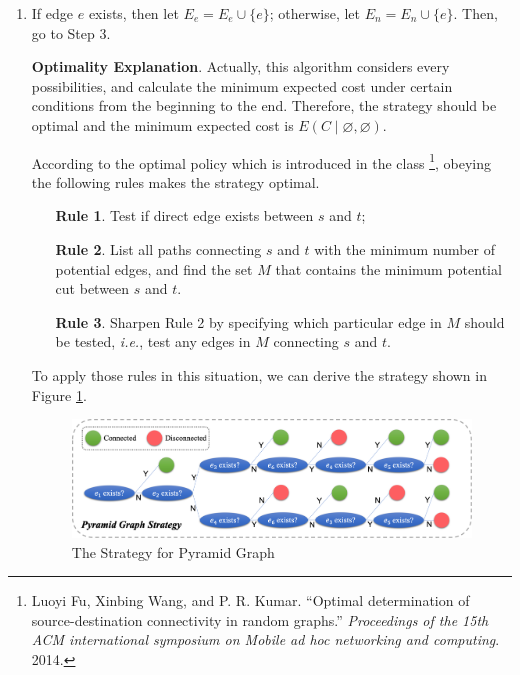 \documentclass{oxmathproblems}
\makeatletter
\theoremstyle{definition}
\renewenvironment{solution}[1][Solution] {\par\pushQED{\qed}\normalfont\topsep6\p@\@plus6\p@\relax\trivlist\item[\hskip\labelsep\bfseries#1\@addpunct{.}]\ignorespaces}{\popQED\endtrivlist\@endpefalse} \makeatother
\makeatother
\begin{document}
\begin{enumerate}
\begin{solution}
\begin{enumerate}
		If edge $e$ exists, then let $E_e = E_e \cup \{e\}$; otherwise, let $E_n = E_n \cup \{e\}$. Then, go to Step 3.
	\end{enumerate} 
	
	\textbf{Optimality Explanation}. Actually, this algorithm considers every possibilities, and calculate the minimum expected cost under certain conditions from the beginning to the end. Therefore, the strategy should be optimal and the minimum expected cost is $E(C\mid \varnothing, \varnothing)$.
	\fi
	
	According to the optimal policy which is introduced in the class \footnote{\label{fu2014}Luoyi Fu, Xinbing Wang, and P. R. Kumar. ``Optimal determination of source-destination connectivity in random graphs.'' \textit{Proceedings of the 15th ACM international symposium on Mobile ad hoc networking and computing}. 2014.}, obeying the following rules makes the strategy optimal.
	
	\begin{enumerate}
		\item[\textbf{Rule 1}. ] Test if direct edge exists between $s$ and $t$;
		\item[\textbf{Rule 2}. ] List all paths connecting $s$ and $t$ with the minimum number of potential edges, and find the set $M$ that contains the minimum potential cut between $s$ and $t$.
		\item[\textbf{Rule 3}. ] Sharpen Rule 2 by specifying which particular edge in $M$ should be tested, \textit{i.e.}, test any edges in $M$ connecting $s$ and $t$.
	\end{enumerate}

	To apply those rules in this situation, we can derive the strategy shown in Figure \ref{fig2}.
	\begin{figure}[htbp]
		\centering
		\includegraphics[width=15cm]{1-strategy.png}
		\caption{The Strategy for Pyramid Graph}
		\label{fig2}
	\end{figure}
	

\end{solution}
\end{enumerate}
\end{document}

